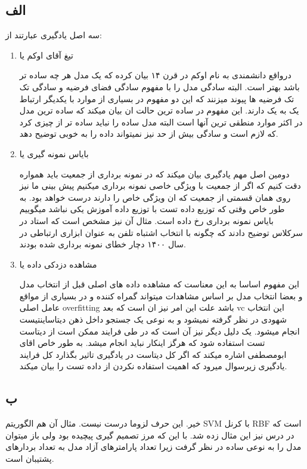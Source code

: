 \documentclass{article}[12pt]
\begin{document}
\subsection{الف}
سه اصل یادگیری عبارتند از:
\begin{enumerate}
\item
تیغ آقای اوکم یا 

درواقع دانشمندی به نام اوکم در قرن ۱۴ بیان کرده که یک مدل هر چه ساده تر باشد بهتر است. البته سادگی مدل را با مفهوم سادگی فضای فرضیه و سادگی تک تک فرضیه ها پیوند میزنند که این دو مفهوم در بسیاری از موارد با یکدیگر ارتباط یک به یک دارند. 
این مفهوم در ساده ترین حالت ان بیان میکند که ساده ترین مدل در اکثر موارد منطقی ترین آنها است البته مدل ساده را نباید ساده تر از چیزی کرد که لازم است و سادگی بیش از حد نیز نمیتواند داده را به خوبی توضیح دهد. 
\item
بایاس نمونه گیری یا 

دومین اصل مهم یادگیری بیان میکند که در نمونه برداری از جمعیت باید همواره دقت کنیم که اگر از جمعیت با ویژگی خاصی نمونه برداری میکنیم پیش بینی ما نیز روی همان قسمتی از جمعیت که ان ویژگی خاص را دارند درست خواهد بود.
به طور خاص وقتی که توزیع داده تست با توزیع داده آموزش یکی نباشد میگوییم بایاس نمونه برداری رخ داده است. مثال آن نیز مشخص است که استاد در سرکلاس توضیح دادند که چگونه با انتخاب اشتباه تلفن به عنوان ابزاری ارتباطی در سال ۱۴۰۰ دچار خطای نمونه برداری شده بودند. 

 
\item مشاهده دزدکی داده یا 

این مفهوم اساسا به این معناست که مشاهده داده های اصلی قبل از انتخاب مدل و بعضا انتخاب مدل بر اساس مشاهدات میتواند گمراه کننده و در بسیاری از مواقع عامل اصلی 
overfitting
باشد علت این امر نیز ان است که بعد 
vc
این انتخاب شهودی در نظر گرفته نمیشود و به نوعی یک جستجو داخل ذهن دیتاساینتیست انجام میشود. یک دلیل دیگر نیز آن است که در طی فرایند ممکن است از دیتاست تست استفاده شود که هرگز اینکار نباید انجام میشد. 
به طور خاص اقای ابومصطفی اشاره میکند که اگر کل دیتاست در یادگیری تاثیر بگذارد کل فرایند یادگیری زیرسوال میرود که اهمیت استفاده نکردن از داده تست را بیان میکند. 

\end{enumerate}

\subsection{ب}
خیر. این حرف لزوما درست نیست. مثال آن هم الگوریتم SVM
با کرنل 
RBF
است که در درس نیز این مثال زده شد. با این که مرز تصمیم گیری پیچیده بود ولی باز میتوان مدل را به نوعی ساده در نظر گرفت زیرا تعداد پارامترهای آزاد مدل به تعداد بردارهای پشتیبان است. 
\end{document}
